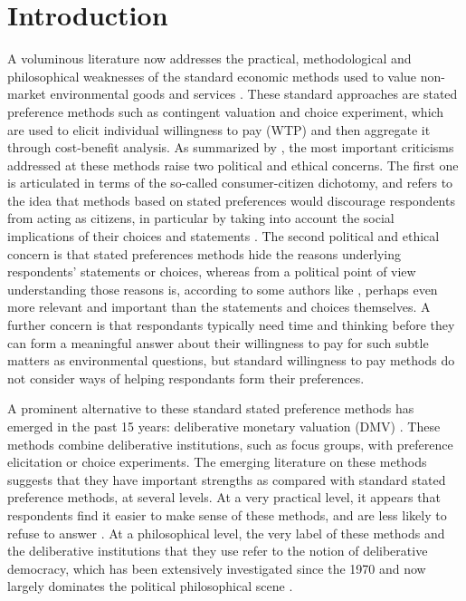 \documentclass[version=3.21, pagesize, twoside=off, bibliography=totoc, DIV=calc, fontsize=12pt, a4paper, french, english]{scrartcl}
\begin{document}
\section{Introduction}
A voluminous literature now addresses the practical, methodological and philosophical weaknesses of the standard economic methods used to value non-market environmental goods and services \citep{meinard_ethical_2016}. 
These standard approaches are stated preference methods such as contingent valuation and choice experiment, which are used to elicit individual willingness to pay (WTP) and then aggregate it through cost-benefit analysis. 
As summarized by \citet{bartkowski_beyond_2018}, the most important criticisms addressed at these methods raise two political and ethical concerns. 
The first one is articulated in terms of the so-called consumer-citizen dichotomy, and refers to the idea that methods based on stated preferences would discourage respondents from acting as citizens, in particular by taking into account the social implications of their choices and statements \citep{soma_representing_2014, vatn_institutional_2009}. 
The second political and ethical concern is that stated preferences methods hide the reasons underlying respondents' statements or choices, whereas from a political point of view understanding those reasons is, according to some authors like \citet{sen_environmental_1995}, perhaps even more relevant and important than the statements and choices themselves. A further concern is that respondants typically need time and thinking before they can form a meaningful answer about their willingness to pay for such subtle matters as environmental questions, but standard willingness to pay methods do not consider ways of helping respondants form their preferences.

A prominent alternative to these standard stated preference methods has emerged in the past 15 years: deliberative monetary valuation (DMV) \citep{spash_deliberative_2007,bartkowski_economic_2017}. 
These methods combine deliberative institutions, such as focus groups, with preference elicitation or choice experiments. 
The emerging literature on these methods suggests that they have important strengths as compared with standard stated preference methods, at several levels. 
At a very practical level, it appears that respondents find it easier to make sense of these methods, and are less likely to refuse to answer \citep{lienhoop_contingent_2007,szabo_reducing_2011}. 
At a philosophical level, the very label of these methods and the deliberative institutions that they use refer to the notion of deliberative democracy, which has been extensively investigated since the 1970 and now largely dominates the political philosophical scene \citep{chappell_deliberative_2012}.
\end{document}
